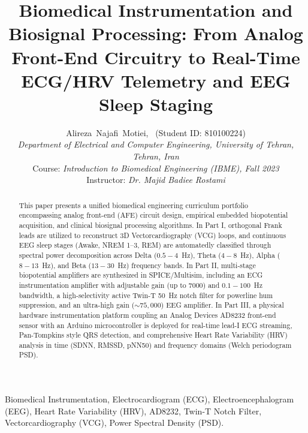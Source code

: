 \documentclass[journal,10pt,twocolumn]{IEEEtran}
\begin{document}
\title{Biomedical Instrumentation and Biosignal Processing: From Analog Front-End Circuitry to Real-Time ECG/HRV Telemetry and EEG Sleep Staging}

\author{Alireza~Najafi~Motiei,~ (Student ID: 810100224)\\
\textit{Department of Electrical and Computer Engineering, University of Tehran, Tehran, Iran}\\
Course: \textit{Introduction to Biomedical Engineering (IBME), Fall 2023}\\
Instructor: \textit{Dr. Majid Badiee Rostami}}

\maketitle

\begin{abstract}
This paper presents a unified biomedical engineering curriculum portfolio encompassing analog front-end (AFE) circuit design, empirical embedded biopotential acquisition, and clinical biosignal processing algorithms. In Part I, orthogonal Frank leads are utilized to reconstruct 3D Vectorcardiography (VCG) loops, and continuous EEG sleep stages (Awake, NREM 1--3, REM) are automatedly classified through spectral power decomposition across Delta ($0.5-4$~Hz), Theta ($4-8$~Hz), Alpha ($8-13$~Hz), and Beta ($13-30$~Hz) frequency bands. In Part II, multi-stage biopotential amplifiers are synthesized in SPICE/Multisim, including an ECG instrumentation amplifier with adjustable gain (up to 7000) and $0.1-100$~Hz bandwidth, a high-selectivity active Twin-T 50~Hz notch filter for powerline hum suppression, and an ultra-high gain ($\sim 75,000$) EEG amplifier. In Part III, a physical hardware instrumentation platform coupling an Analog Devices AD8232 front-end sensor with an Arduino microcontroller is deployed for real-time lead-I ECG streaming, Pan-Tompkins style QRS detection, and comprehensive Heart Rate Variability (HRV) analysis in time (SDNN, RMSSD, pNN50) and frequency domains (Welch periodogram PSD).
\end{abstract}

\begin{IEEEkeywords}
Biomedical Instrumentation, Electrocardiogram (ECG), Electroencephalogram (EEG), Heart Rate Variability (HRV), AD8232, Twin-T Notch Filter, Vectorcardiography (VCG), Power Spectral Density (PSD).
\end{IEEEkeywords}
\end{document}

